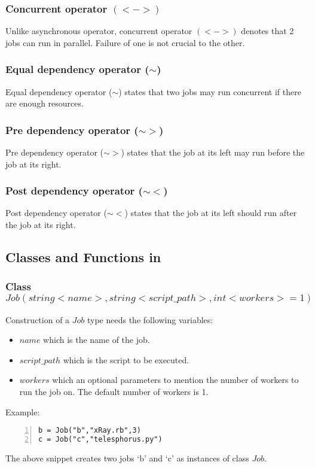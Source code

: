 \subsubsection*{Concurrent operator $(<->)$}
Unlike asynchronous operator, concurrent operator $(<->)$ denotes that 2 jobs can
run in parallel. Failure of one is not crucial to the other.
\subsubsection*{Equal dependency operator ($\sim$)}
Equal dependency operator ($\sim$) states that two jobs may run concurrent if there
are enough resources.
\subsubsection*{Pre dependency operator ($\sim>$)}
Pre dependency operator ($\sim>$) states that the job at its left may run before the job
at its right.
\subsubsection*{Post dependency operator ($\sim<$)}
Post dependency operator ($\sim<$) states that the job at its left should run after the job
at its right.

\subsection*{Classes and Functions in \lang{}}
\subsubsection*{Class $Job(string <name>, string <script\_path>, int <workers>=1)$}
Construction of a $Job$ type needs the following variables:
\begin{itemize}
\item $name$ which is the name of the job.
\item $script\_path$ which is the script to be executed.
\item $workers$ which an optional parameters to mention the number of workers to run the job on. The default number of workers is 1.
\end{itemize}
Example:\\
\begin{Verbatim}[numbers=left]
b = Job("b","xRay.rb",3)
c = Job("c","telesphorus.py")
\end{Verbatim}
The above snippet creates two jobs `b' and `c' as instances of class $Job$.
